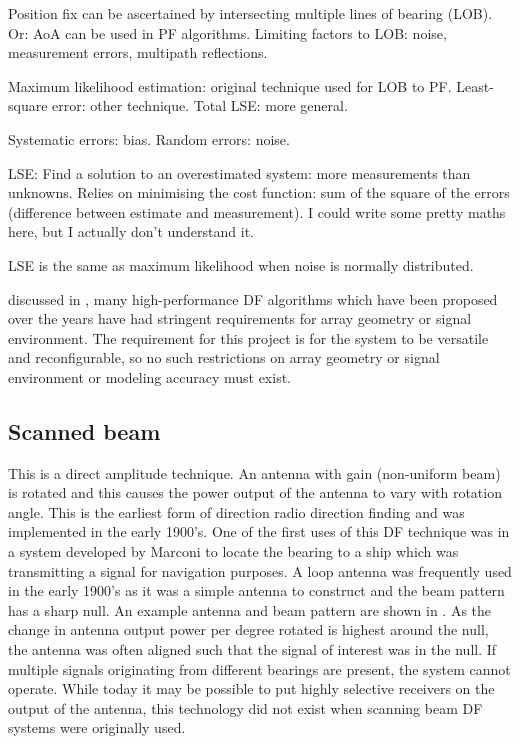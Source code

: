 Position fix can be ascertained by intersecting multiple lines of bearing (LOB). Or: AoA can be used in PF algorithms. 
Limiting factors to LOB: noise, measurement errors, multipath reflections. 

Maximum likelihood estimation: original technique used for LOB to PF. 
Least-square error: other technique. Total LSE: more general. 

Systematic errors: bias. Random errors: noise. 

LSE: Find a solution to an overestimated system: more measurements than unknowns. Relies on minimising the cost function: sum of the square of the errors (difference between estimate and measurement). I could write some pretty maths here, but I actually don't understand it. 

LSE is the same as maximum likelihood when noise is normally distributed.

discussed in \cite{farrier1990direction}, many high-performance DF algorithms which have been proposed over the years have had stringent requirements for array geometry or signal environment. The requirement for this project is for the system to be versatile and reconfigurable, so no such restrictions on array geometry or signal environment or modeling accuracy must exist. 


\subsection{Scanned beam}
This is a direct amplitude technique. An antenna with gain (non-uniform beam) is rotated and this causes the power output of the antenna to vary with rotation angle. This is the earliest form of direction radio direction finding and was implemented in the early 1900's. 
One of the first uses of this DF technique was in a system developed by Marconi to locate the bearing to a ship which was transmitting a signal for navigation purposes\cite{jenkins1991smallaperture}. A loop antenna was frequently used in the early 1900's as it was a simple antenna to construct and the beam pattern has a sharp null. 
An example antenna and beam pattern are shown in . As the change in antenna output power per degree rotated is highest around the null, the antenna was often aligned such that the signal of interest was in the null. 
If multiple signals originating from different bearings are present, the system cannot operate. 
While today it may be possible to put highly selective receivers on the output of the antenna, this technology did not exist when scanning beam DF systems were originally used.

